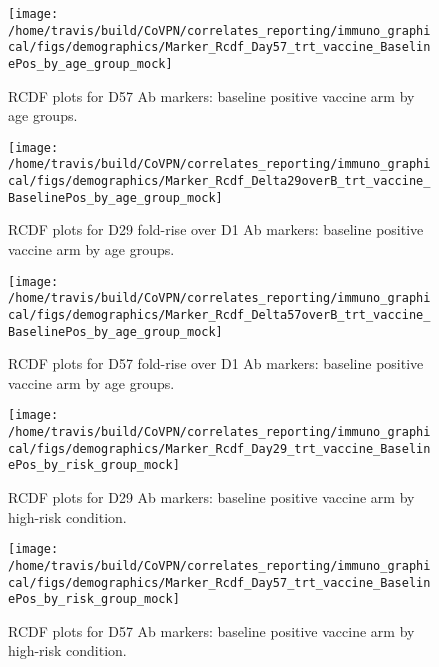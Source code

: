 \documentclass[]{book}
\theoremstyle{definition}
\theoremstyle{definition}
\theoremstyle{definition}
\newcommand{\1}{\mathbbm{1}}
\begin{document}
\begin{figure}[H]

{\centering \texttt{[image: /home/travis/build/CoVPN/correlates\_reporting/immuno\_graphical/figs/demographics/Marker\_Rcdf\_Day57\_trt\_vaccine\_BaselinePos\_by\_age\_group\_mock]} 

}

\caption{RCDF plots for D57 Ab markers: baseline positive vaccine arm by age groups.}\label{fig:unnamed-chunk-93}
\end{figure}

\begin{figure}[H]

{\centering \texttt{[image: /home/travis/build/CoVPN/correlates\_reporting/immuno\_graphical/figs/demographics/Marker\_Rcdf\_Delta29overB\_trt\_vaccine\_BaselinePos\_by\_age\_group\_mock]} 

}

\caption{RCDF plots for D29 fold-rise over D1 Ab markers: baseline positive vaccine arm by age groups.}\label{fig:unnamed-chunk-94}
\end{figure}

\begin{figure}[H]

{\centering \texttt{[image: /home/travis/build/CoVPN/correlates\_reporting/immuno\_graphical/figs/demographics/Marker\_Rcdf\_Delta57overB\_trt\_vaccine\_BaselinePos\_by\_age\_group\_mock]} 

}

\caption{RCDF plots for D57 fold-rise over D1 Ab markers: baseline positive vaccine arm by age groups.}\label{fig:unnamed-chunk-95}
\end{figure}

\begin{figure}[H]

{\centering \texttt{[image: /home/travis/build/CoVPN/correlates\_reporting/immuno\_graphical/figs/demographics/Marker\_Rcdf\_Day29\_trt\_vaccine\_BaselinePos\_by\_risk\_group\_mock]} 

}

\caption{RCDF plots for D29 Ab markers: baseline positive vaccine arm by high-risk condition.}\label{fig:unnamed-chunk-96}
\end{figure}

\begin{figure}[H]

{\centering \texttt{[image: /home/travis/build/CoVPN/correlates\_reporting/immuno\_graphical/figs/demographics/Marker\_Rcdf\_Day57\_trt\_vaccine\_BaselinePos\_by\_risk\_group\_mock]} 

}

\caption{RCDF plots for D57 Ab markers: baseline positive vaccine arm by high-risk condition.}\label{fig:unnamed-chunk-97}
\end{figure}
\end{document}
